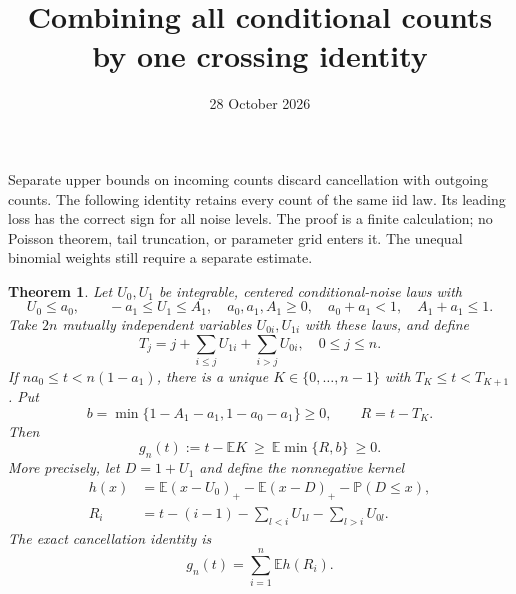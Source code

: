\documentclass[11pt]{article}
\title{Combining all conditional counts by one crossing identity}
\author{}\date{28 October 2026}
\newtheorem{theorem}{Theorem}\newcommand{\E}{\mathbb E}\newcommand{\Pp}{\mathbb P}
\begin{document}
\maketitle

Separate upper bounds on incoming counts discard cancellation with outgoing
counts. The following identity retains every count of the same iid law.
Its leading loss has the correct sign for all noise levels. The proof is a
finite calculation; no Poisson theorem, tail truncation, or parameter grid
enters it. The unequal binomial weights still require a separate estimate.

\begin{theorem}\label{thm:mesh}
Let $U_0,U_1$ be integrable, centered conditional-noise laws with
\[
 U_0\le a_0,\qquad -a_1\le U_1\le A_1,
 \quad a_0,a_1,A_1\ge0,\quad a_0+a_1<1,\quad A_1+a_1\le1.
\]
Take $2n$ mutually independent variables $U_{0i},U_{1i}$ with these laws,
and define
\[
 T_j=j+\sum_{i\le j}U_{1i}+\sum_{i>j}U_{0i},\quad 0\le j\le n.
\]
If $na_0\le t<n(1-a_1)$, there is a unique $K\in\{0,\ldots,n-1\}$
with $T_K\le t<T_{K+1}$. Put
\[
 b=\min\{1-A_1-a_1,1-a_0-a_1\}\ge0,\qquad R=t-T_K.
\]
Then
\begin{equation}\label{eq:gain}
              g_n(t):=t-\E K\ \ge\ \E\min\{R,b\}\ \ge0.
\end{equation}
More precisely, let $D=1+U_1$ and define the nonnegative kernel
\begin{align*}
 h(x)&=\E(x-U_0)_+-\E(x-D)_+-\Pp(D\le x),\\
 R_i&=t-(i-1)-\sum_{l<i}U_{1l}-\sum_{l>i}U_{0l}.
\end{align*}
The exact cancellation identity is
\begin{equation}\label{eq:identity}
                       g_n(t)=\sum_{i=1}^n\E h(R_i).
\end{equation}
\end{theorem}
\end{document}
